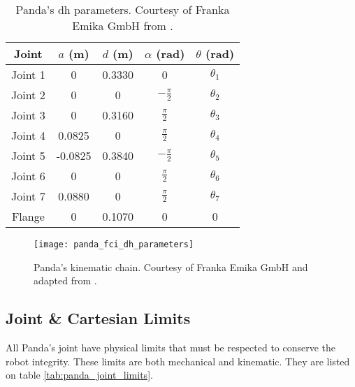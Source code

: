 \begin{table}[htbp]
    \caption{Panda's \gls{dh} parameters. Courtesy of Franka Emika GmbH from \cite{FrankaEmikaGmbH_fci_documentation}.}
    \centering
    \begin{tabular}{c|c|c|c|c}
        \toprule
        \textbf{Joint} & \textbf{$a$ (m)} & \textbf{$d$ (m)} & \textbf{$\alpha$ (rad)} & \textbf{$\theta$ (rad)} \\
        \midrule
         Joint 1 & 0 & 0.3330 & 0 & $\theta_1$ \\
         \midrule
         Joint 2 & 0 & 0 & $-\frac{\pi}{2}$ & $\theta_2$ \\
         \midrule
         Joint 3 & 0 & 0.3160 & $\frac{\pi}{2}$ & $\theta_3$ \\
         \midrule
         Joint 4 & 0.0825 & 0 & $\frac{\pi}{2}$ & $\theta_4$ \\
         \midrule
         Joint 5 & -0.0825 & 0.3840 & $-\frac{\pi}{2}$ & $\theta_5$ \\
         \midrule
         Joint 6 & 0 & 0 & $\frac{\pi}{2}$ & $\theta_6$ \\
         \midrule
         Joint 7 & 0.0880 & 0 & $\frac{\pi}{2}$ & $\theta_7$ \\
         \midrule
         Flange & 0 & 0.1070 & 0 & 0 \\
         \bottomrule
    \end{tabular}
    \label{tab:panda_dh_parameters}
\end{table}


\begin{figure}[htbp]
    \centering
	\texttt{[image: panda\_fci\_dh\_parameters]}
	\caption{Panda's kinematic chain. Courtesy of Franka Emika GmbH and adapted from \cite{FrankaEmikaGmbH_fci_documentation}.}
	\label{fig:panda_fci_dh_parameters}
\end{figure}


\subsection{Joint \& Cartesian Limits}
\label{robotic_system_constraints_kinematics_joint_cartesian_limits}

All Panda's joint have physical limits that must be respected to conserve the robot integrity. These limits are both mechanical and kinematic. They are listed on table \ref{tab:panda_joint_limits}.

